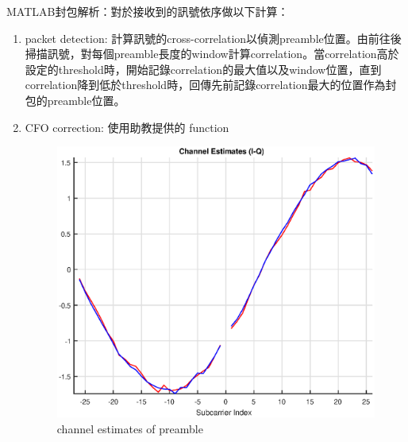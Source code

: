 \documentclass[10pt,a4paper]{article}
\begin{document}
MATLAB封包解析：對於接收到的訊號依序做以下計算：
\begin{enumerate}
    \item packet detection: 計算訊號的cross-correlation以偵測preamble位置。由前往後掃描訊號，對每個preamble長度的window計算correlation。當correlation高於設定的threshold時，開始記錄correlation的最大值以及window位置，直到correlation降到低於threshold時，回傳先前記錄correlation最大的位置作為封包的preamble位置。
    \item CFO correction: 使用助教提供的 function \\
    \hspace*{-\leftmargin}
    \begin{minipage}{\linewidth+\leftmargin}
        \centering
        \begin{minipage}{0.45\linewidth}
            \begin{figure}[H]
                \includegraphics[trim=30 10 30 10,clip,width=\linewidth]
                {figures/channel_1}
                \caption{channel estimates of preamble}
            \end{figure}
        \end{minipage}
        \begin{minipage}{0.45\linewidth}
            \begin{figure}[H]

\end{figure}
\end{minipage}
\end{minipage}
\end{enumerate}
\end{document}
